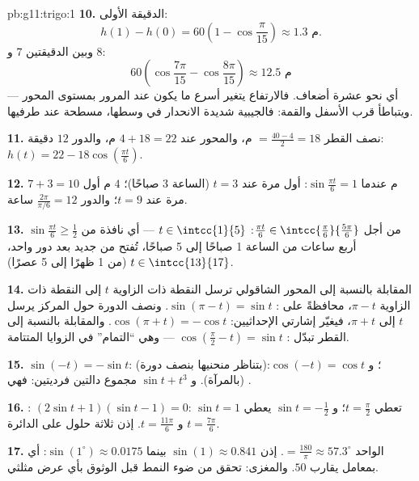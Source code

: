 \begin{solution}{pb:g11:trigo:1}
\textbf{10.} الدقيقة الأولى:
\[
h(1) - h(0) = 60\left(1 - \cos\frac{\pi}{15}\right)
\approx 1.3 \text{ م}.
\]
وبين الدقيقتين $7$ و $8$:
\[
60\left(\cos\frac{7\pi}{15} - \cos\frac{8\pi}{15}\right)
\approx 12.5 \text{ م}
\]
--- أي نحو عشرة أضعاف. فالارتفاع يتغير أسرع ما يكون عند المرور بمستوى المحور
ويتباطأ قرب الأسفل والقمة: فالجيبية شديدة الانحدار في
وسطها، مسطحة عند طرفيها.

\textbf{11.} نصف القطر $= \frac{40 - 4}{2} = 18$ م، والمحور عند
$4 + 18 = 22$ م، والدور $12$ دقيقة:
$h(t) = 22 - 18\cos\left(\frac{\pi t}{6}\right)$.

\textbf{12.}  $7 + 3 = 10$ م عندما
$\sin\frac{\pi t}{6} = 1$: أول مرة عند $t = 3$ (الساعة 3 صباحًا)؛
 $4$ م أول مرة عند $t = 9$؛ والدور
$\frac{2\pi}{\pi/6} = 12$ ساعة.

\textbf{13.} $\sin\frac{\pi t}{6} \geq \frac12$ من أجل
$\frac{\pi t}{6} \in \intcc{\frac\pi6}{\frac{5\pi}{6}}$:
$t \in \intcc{1}{5}$ --- أي نافذة من أربع ساعات من الساعة 1 صباحًا إلى 5
صباحًا، تُفتح من جديد بعد دور واحد، $t \in \intcc{13}{17}$
(من 1 ظهرًا إلى 5 عصرًا).

\textbf{14.} المقابلة بالنسبة إلى المحور الشاقولي ترسل النقطة ذات
الزاوية $t$ إلى النقطة ذات الزاوية $\pi - t$، محافظةً على
: $\sin(\pi - t) = \sin t$. ونصف الدورة حول
المركز يرسل $t$ إلى $\pi + t$، فيغيّر إشارتي الإحداثيين:
$\cos(\pi + t) = -\cos t$. والمقابلة بالنسبة إلى القطر
تبدّل  :
$\cos\left(\frac\pi2 - t\right) = \sin t$ --- وهي
``التمام'' في الزوايا المتتامة.

\textbf{15.} $\sin(-t) = -\sin t$:  (بتناظر منحنيها
بنصف دورة)؛ و $\cos(-t) = \cos t$:  (بالمرآة). و
$\sin t + t^3$ مجموع دالتين فرديتين: فهي .

\textbf{16.} : $(2\sin t + 1)(\sin t - 1) = 0$:
 $\sin t = 1$ تعطي $t = \frac\pi2$؛ و
$\sin t = -\frac12$ يعطي $t = \frac{7\pi}{6}$ و
$t = \frac{11\pi}{6}$. إذن ثلاثة حلول على الدائرة.

\textbf{17.}  الواحد $= \frac{180}{\pi} \approx 57.3^\circ$.
إذن $\sin(1) \approx 0.841$ بينما $\sin(1^\circ) \approx
0.0175$: أي بمعامل يقارب $50$. والمغزى: تحقق من ضوء النمط
قبل الوثوق بأي عرض مثلثي.


\end{solution}
